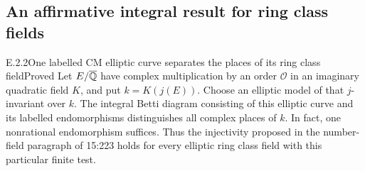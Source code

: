 \subsection{An affirmative integral result for ring class fields}

\begin{result}{E.2.2}{One labelled CM elliptic curve separates the places of its ring class field}{Proved}
Let $E/\overline{\mathbb Q}$ have complex multiplication by an order $\mathcal O$ in an imaginary quadratic field $K$, and put $k=K(j(E))$. Choose an elliptic model of that $j$-invariant over $k$. The integral Betti diagram consisting of this elliptic curve and its labelled endomorphisms distinguishes all complex places of $k$. In fact, one nonrational endomorphism suffices. Thus the injectivity proposed in the number-field paragraph of 15:223 holds for every elliptic ring class field with this particular finite test.
\end{result}
